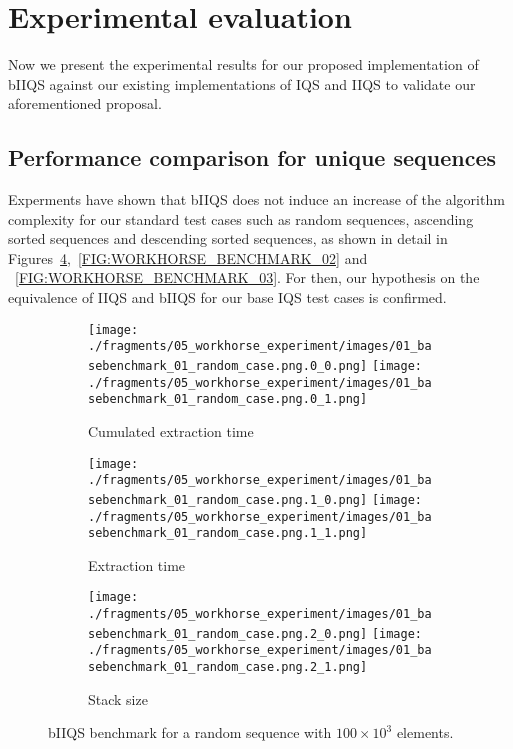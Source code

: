 \section{Experimental evaluation}

Now we present the experimental results for our proposed implementation of bIIQS against our existing implementations of IQS and IIQS to validate our aforementioned proposal.\\


\subsection{Performance comparison for unique sequences}

Experments have shown that bIIQS does not induce an increase of the algorithm complexity for our standard test cases such as random sequences, ascending sorted sequences and descending sorted sequences, as shown in detail in Figures~\ref{FIG:WORKHORSE_BENCHMARK_01},~\ref{FIG:WORKHORSE_BENCHMARK_02} and ~\ref{FIG:WORKHORSE_BENCHMARK_03}. For then, our hypothesis on the equivalence of IIQS and bIIQS for our base IQS test cases is confirmed. \\


\begin{figure}

    \centering
    \begin{subfigure}[b]{\textwidth}
        \centering
        \texttt{[image: ./fragments/05\_workhorse\_experiment/images/01\_basebenchmark\_01\_random\_case.png.0\_0.png]}
        \texttt{[image: ./fragments/05\_workhorse\_experiment/images/01\_basebenchmark\_01\_random\_case.png.0\_1.png]}
        \caption{Cumulated extraction time}
        \label{FIG:WORKHORSE_BENCHMARK_01__0_0}
    \end{subfigure}

    \begin{subfigure}[b]{\textwidth}
        \centering
        \texttt{[image: ./fragments/05\_workhorse\_experiment/images/01\_basebenchmark\_01\_random\_case.png.1\_0.png]}
        \texttt{[image: ./fragments/05\_workhorse\_experiment/images/01\_basebenchmark\_01\_random\_case.png.1\_1.png]}
        \caption{Extraction time}
        \label{FIG:WORKHORSE_BENCHMARK_01__0_0}
    \end{subfigure}

    \begin{subfigure}[b]{\textwidth}
        \centering
        \texttt{[image: ./fragments/05\_workhorse\_experiment/images/01\_basebenchmark\_01\_random\_case.png.2\_0.png]}
        \texttt{[image: ./fragments/05\_workhorse\_experiment/images/01\_basebenchmark\_01\_random\_case.png.2\_1.png]}
        \caption{Stack size}
        \label{FIG:WORKHORSE_BENCHMARK_01__0_0}
    \end{subfigure}
    
    \caption{bIIQS benchmark for a random sequence with $100\times10^3$ elements.}
       \label{FIG:WORKHORSE_BENCHMARK_01}
\end{figure}


